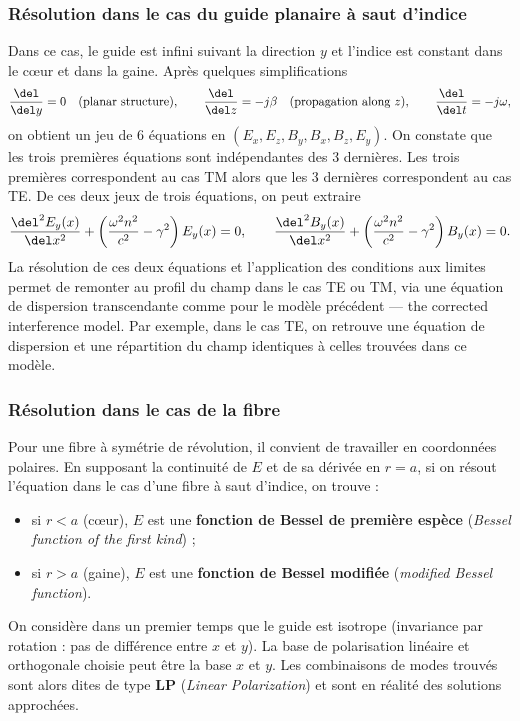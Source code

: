 \subsubsection{Résolution dans le cas du guide planaire à saut d'indice}
Dans ce cas, le guide est infini suivant la direction $y$ et l'indice est
constant dans le cœur et dans la gaine. Après quelques simplifications
\[
  \frac{\del}{\del y} = 0 \quad(\text{planar structure}), \qquad
  \frac{\del}{\del z} = -j\beta \quad(\text{propagation along } z), \qquad
  \frac{\del}{\del t} = -j\omega,
\]
on obtient un jeu de 6 équations en $(E_x, E_z, B_y, B_x, B_z, E_y)$. On
constate que les trois premières équations sont indépendantes des 3 dernières.
Les trois premières correspondent au cas TM alors que les 3 dernières
correspondent au cas TE. De ces deux jeux de trois équations, on peut extraire
\begin{equation*}
  \frac{\del^2 E_y(x)}{\del x^2}
    + \left(\frac{\omega^2 n^2}{c^2} - \gamma^2\right) E_y(x) = 0,
  \qquad
  \frac{\del^2 B_y(x)}{\del x^2}
    + \left(\frac{\omega^2 n^2}{c^2} - \gamma^2\right) B_y(x) = 0 .
\end{equation*}
La résolution de ces deux équations et l'application des conditions aux
limites permet de remonter au profil du champ dans le cas TE ou TM, via une
équation de dispersion transcendante comme pour le modèle précédent --- the
corrected interference model. Par exemple, dans le cas TE, on retrouve une
équation de dispersion et une répartition du champ identiques à celles
trouvées dans ce modèle.

\subsubsection{Résolution dans le cas de la fibre}
Pour une fibre à symétrie de révolution, il convient de travailler en
coordonnées polaires. En supposant la continuité de $E$ et de sa dérivée en
$r = a$, si on résout l'équation dans le cas d'une fibre à saut d'indice, on
trouve :
\begin{itemize}
  \item si $r < a$ (cœur), $E$ est une \textbf{fonction de Bessel de première
    espèce} (\textit{Bessel function of the first kind}) ;
  \item si $r > a$ (gaine), $E$ est une \textbf{fonction de Bessel modifiée}
    (\textit{modified Bessel function}).
\end{itemize}
On considère dans un premier temps que le guide est isotrope (invariance par
rotation : pas de différence entre $x$ et $y$). La base de polarisation
linéaire et orthogonale choisie peut être la base $x$ et $y$. Les combinaisons
de modes trouvés sont alors dites de type \textbf{LP} (\textit{Linear
Polarization}) et sont en réalité des solutions approchées.

